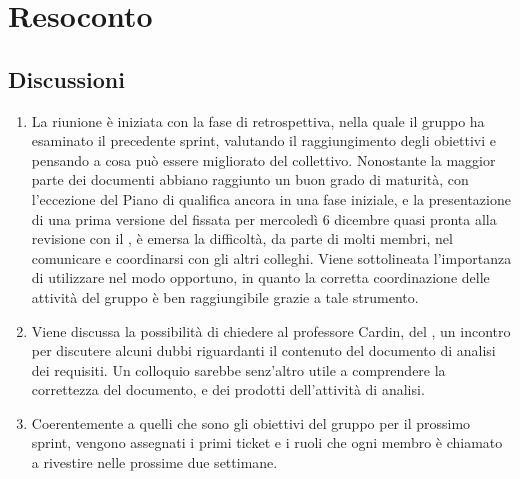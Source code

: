 \section{Resoconto} \label{sec:resoconto}
\subsection{Discussioni} \label{subsec:resdiscussione}
\begin{enumerate}
    \item La riunione è iniziata con la fase di retrospettiva, nella quale il gruppo ha esaminato il precedente sprint, valutando il raggiungimento degli obiettivi e pensando a cosa può essere migliorato del  collettivo. Nonostante la maggior parte  dei documenti abbiano raggiunto un buon grado di maturità, con l'eccezione del Piano di qualifica ancora in una fase iniziale, e la presentazione di una prima versione del  fissata per mercoledì 6 dicembre quasi pronta alla revisione con il , è emersa la difficoltà, da parte di molti membri, nel comunicare e coordinarsi con gli altri colleghi. Viene sottolineata l'importanza di utilizzare  nel modo opportuno,  in quanto la corretta coordinazione delle attività del gruppo è ben raggiungibile grazie a tale strumento.
    \item Viene discussa la possibilità di chiedere al professore Cardin,  del , un incontro per discutere alcuni dubbi riguardanti il contenuto del documento di analisi dei requisiti. Un colloquio sarebbe senz'altro utile a comprendere la correttezza del documento, e dei prodotti dell'attività di analisi.
    \item Coerentemente a quelli che sono gli obiettivi del gruppo per il prossimo sprint, vengono assegnati i primi ticket e i ruoli che ogni membro è chiamato a rivestire nelle prossime due settimane.
\end{enumerate}

